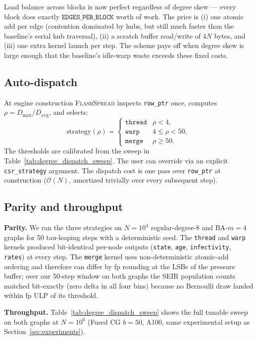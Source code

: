 \documentclass[a4paper,fleqn]{cas-sc}
\theoremstyle{definition}
\theoremstyle{remark}
\newcommand{\flashspread}{\textsc{FlashSpread}}
\newcommand{\bigO}{\mathcal{O}}
\begin{document}
Load balance across blocks is now perfect regardless of degree skew --- every block does exactly $\texttt{EDGES\_PER\_BLOCK}$ worth of work. The price is (i) one atomic add per edge (contention dominated by hubs, but still much faster than the baseline's serial hub traversal), (ii) a scratch buffer read/write of $4N$ bytes, and (iii) one extra kernel launch per step. The scheme pays off when degree skew is large enough that the baseline's idle-warp waste exceeds these fixed costs.

\subsection{Auto-dispatch}

At engine construction \flashspread{} inspects \texttt{row\_ptr} once, computes $\rho = D_{\max}/D_{\mathrm{avg}}$, and selects:
\begin{equation}
\text{strategy}(\rho) = \begin{cases}
\texttt{thread} & \rho < 4, \\
\texttt{warp}   & 4 \leq \rho < 50, \\
\texttt{merge}  & \rho \geq 50.
\end{cases}
\end{equation}
The thresholds are calibrated from the sweep in Table~\ref{tab:degree_dispatch_sweep}. The user can override via an explicit \texttt{csr\_strategy} argument. The dispatch cost is one pass over \texttt{row\_ptr} at construction ($\bigO(N)$, amortized trivially over every subsequent step).

\subsection{Parity and throughput}

\textbf{Parity.} We ran the three strategies on $N = 10^4$ regular-degree-8 and BA-$m{=}4$ graphs for 50 tau-leaping steps with a deterministic seed. The \texttt{thread} and \texttt{warp} kernels produced bit-identical per-node outputs (\texttt{state}, \texttt{age}, \texttt{infectivity}, \texttt{rates}) at every step. The \texttt{merge} kernel uses non-deterministic atomic-add ordering and therefore can differ by fp rounding at the LSBs of the pressure buffer; over our 50-step window on both graphs the SEIR population counts matched bit-exactly (zero delta in all four bins) because no Bernoulli draw landed within fp ULP of its threshold.

\textbf{Throughput.} Table~\ref{tab:degree_dispatch_sweep} shows the full tunable sweep on both graphs at $N = 10^6$ (Fused CG $b = 50$, A100, same experimental setup as Section~\ref{sec:experiments}).
\end{document}
